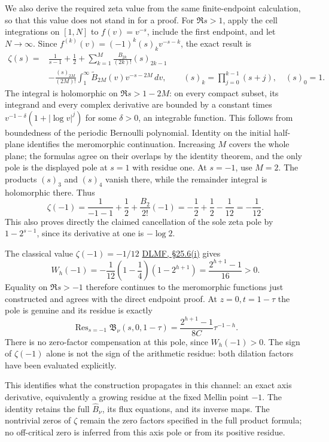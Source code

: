 We also derive the required zeta value from the same finite-endpoint
calculation, so that this value does not stand in for a proof.
For \(\Re s>1\), apply the cell integrations on \([1,N]\) to
\(f(v)=v^{-s}\), include the first endpoint, and let \(N\to\infty\).
Since \(f^{(k)}(v)=(-1)^k(s)_k v^{-s-k}\), the exact result is
\begin{align*}
 \zeta(s)={}&\frac1{s-1}+\frac12+
 \sum_{k=1}^{M}\frac{B_{2k}}{(2k)!}(s)_{2k-1}\\
 &-\frac{(s)_{2M}}{(2M)!}
       \int_1^\infty \widetilde B_{2M}(v)v^{-s-2M}\,dv,
 \qquad (s)_k=\prod_{j=0}^{k-1}(s+j),\quad (s)_0=1.
\end{align*}
The integral is holomorphic on \(\Re s>1-2M\): on every compact subset,
its integrand and every complex derivative are bounded by a constant
times \(v^{-1-\delta}(1+|\log v|^j)\) for some \(\delta>0\), an
integrable function. This follows from boundedness of the periodic
Bernoulli polynomial. Identity on the initial half-plane identifies the
meromorphic continuation. Increasing \(M\) covers the whole plane;
the formulas agree on their overlaps by the identity theorem, and the
only pole is the displayed pole at \(s=1\) with residue one.
At \(s=-1\), use \(M=2\). The products \((s)_3\) and \((s)_4\)
vanish there, while the remainder integral is holomorphic there. Thus
\[
 \zeta(-1)=\frac1{-1-1}+\frac12+
                \frac{B_2}{2!}(-1)
          =-\frac12+\frac12-\frac1{12}=-\frac1{12}.
\]
This also proves directly the claimed cancellation of the sole zeta pole
by \(1-2^{s-1}\), since its derivative at one is \(-\log2\).

The classical value \(\zeta(-1)=-1/12\)
\href{https://dlmf.nist.gov/25.6}{DLMF, \S25.6(i)} gives
\[
 W_h(-1)=-\frac1{12}\left(1-\frac14\right)(1-2^{h+1})
         =\frac{2^{h+1}-1}{16}>0.
\]
Equality on \(\Re s>-1\) therefore continues to the meromorphic
functions just constructed and agrees with the direct endpoint proof.
At \(z=0,t=1-\tau\) the pole is genuine and its residue is exactly
\begin{equation}\label{naj:residue}
 \operatorname{Res}_{s=-1}\mathfrak B_\nu(s,0,1-\tau)
     =\frac{2^{h+1}-1}{8C}\tau^{-1-h}.
\end{equation}
There is no zero-factor compensation at this pole, since \(W_h(-1)>0\).
The sign of \(\zeta(-1)\) alone is not the sign of the arithmetic
residue: both dilation factors have been evaluated explicitly.

This identifies what the construction propagates in this channel:
an exact axis derivative, equivalently a growing residue at the fixed
Mellin point \(-1\). The identity retains the full
\(\widehat B_\nu\), its flux equations, and its inverse maps.
The nontrivial zeros of \(\zeta\) remain the zero factors specified
in the full product formula; no off-critical zero is inferred from
this axis pole or from its positive residue.
